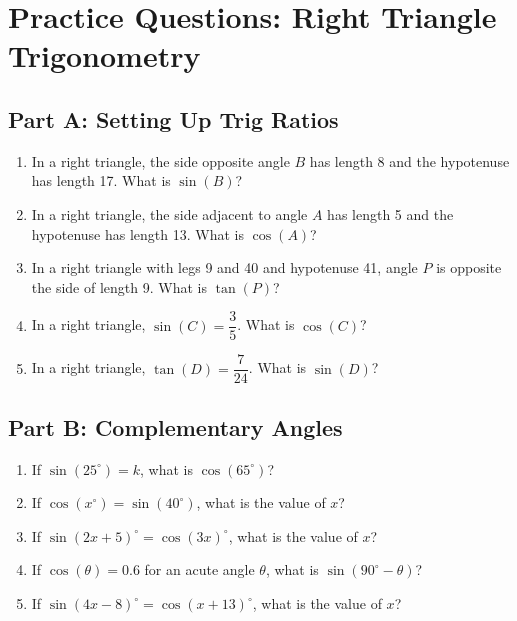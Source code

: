 \documentclass[14pt]{extarticle}
\begin{document}
\newpage

\section*{Practice Questions: Right Triangle Trigonometry}

\subsection*{Part A: Setting Up Trig Ratios}
\begin{enumerate}
  \item In a right triangle, the side opposite angle \(B\) has length 8 and the hypotenuse has length 17. What is \(\sin(B)\)?
  \item In a right triangle, the side adjacent to angle \(A\) has length 5 and the hypotenuse has length 13. What is \(\cos(A)\)?
  \item In a right triangle with legs 9 and 40 and hypotenuse 41, angle \(P\) is opposite the side of length 9. What is \(\tan(P)\)?
  \item In a right triangle, \(\sin(C) = \dfrac{3}{5}\). What is \(\cos(C)\)?
  \item In a right triangle, \(\tan(D) = \dfrac{7}{24}\). What is \(\sin(D)\)?
\end{enumerate}

\subsection*{Part B: Complementary Angles}
\begin{enumerate}
  \item If \(\sin(25^\circ) = k\), what is \(\cos(65^\circ)\)?
  \item If \(\cos(x^\circ) = \sin(40^\circ)\), what is the value of \(x\)?
  \item If \(\sin(2x + 5)^\circ = \cos(3x)^\circ\), what is the value of \(x\)?
  \item If \(\cos(\theta) = 0.6\) for an acute angle \(\theta\), what is \(\sin(90^\circ - \theta)\)?
  \item If \(\sin(4x - 8)^\circ = \cos(x + 13)^\circ\), what is the value of \(x\)?
\end{enumerate}
\end{document}
